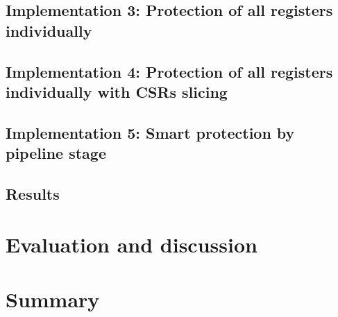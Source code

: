 \subsection{Implementation 3: Protection of all registers individually}

\subsection{Implementation 4: Protection of all registers individually with CSRs slicing}

\subsection{Implementation 5: Smart protection by pipeline stage}

\subsection{Results}


\section{Evaluation and discussion}
\label{section:chap6_discussion}


\section{Summary}


